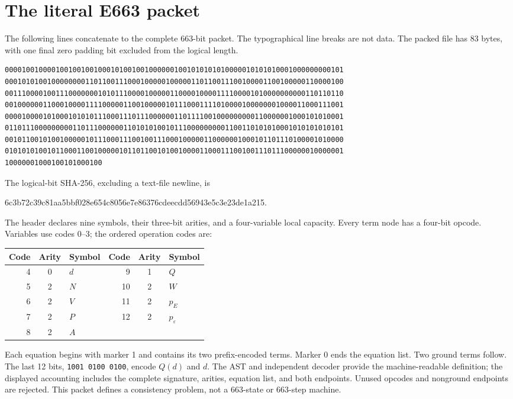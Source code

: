 \section{The literal E663 packet}
The following lines concatenate to the complete 663-bit packet. The
typographical line breaks are not data. The packed file has 83 bytes,
with one final zero padding bit excluded from the logical length.
\begin{lstlisting}[basicstyle=\footnotesize\ttfamily]
00001001000010010010010001010010010000001001010101010000010101010001000000000101
00010101001000000001101100111000100000100000110110011100100001100100000110000100
00111000010011100000001010111000010000011000010000111100001010000000000110110110
00100000011000100001111000001100100000101110001111010000100000001000011000111001
00001000010100010101011100011101110000001101111001000000000110000001000101010001
01101110000000001101110000001101010100101110000000001100110101010001010101010101
00101100101001000001011100011100100111000100000110000001000101101110100001010000
01010101001011000110010000010110110010100100001100011100100111011100000010000001
10000001000100101000100
\end{lstlisting}
The logical-bit SHA-256, excluding a text-file newline, is
\begin{center}\small\ttfamily
6c3b72c39c81aa5bbf028e654c8056e7e86376cdeecdd56943e5c3e23de1a215.
\end{center}
The header declares nine symbols, their three-bit arities, and a
four-variable local capacity. Every term node has a four-bit opcode.
Variables use codes 0--3; the ordered operation codes are:
\begin{center}
\begin{tabular}{rcl@{\qquad}rcl}
\toprule
Code & Arity & Symbol & Code & Arity & Symbol\\
\midrule
4&0&$d$ & 9&1&$Q$\\
5&2&$N$ &10&2&$W$\\
6&2&$V$ &11&2&$p_E$\\
7&2&$P$ &12&2&$p_\varepsilon$\\
8&2&$A$ &&&\\
\bottomrule
\end{tabular}
\end{center}
Each equation begins with marker 1 and contains its two prefix-encoded
terms. Marker 0 ends the equation list. Two ground terms follow. The
last 12 bits, \texttt{1001 0100 0100}, encode $Q(d)$ and $d$.
The AST and independent decoder provide the machine-readable definition;
the displayed accounting includes the complete signature, arities,
equation list, and both endpoints. Unused opcodes and nonground endpoints
are rejected. This packet defines a consistency problem, not a 663-state
or 663-step machine.
